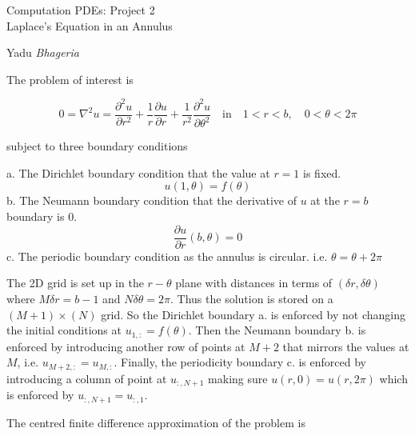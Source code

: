 \documentclass{article}
\begin{document}
\begin{center}
    
    {\Huge Computation PDEs: Project 2}\\
    {\Huge Laplace's Equation in an Annulus}
    \vspace{0.5cm}
    
    {\LARGE Yadu \emph{Bhageria}}\\
    \vspace{0.2cm}
    
\end{center}

The problem of interest is 

\begin{equation}
	0 = \nabla^2 u = \frac{\partial^2 u}{\partial r^2} + \frac{1}{r} \frac{\partial u}{\partial r} + \frac{1}{r^2} \frac{\partial^2 u}{\partial \theta^2}\quad \text{in} \quad 1<r<b, \quad 0<\theta<2\pi
\end{equation}

subject to three boundary conditions

a. The Dirichlet boundary condition that the value at $r = 1$ is fixed.
\begin{equation}
	u(1,\theta) = f(\theta)
\end{equation}
b. The Neumann boundary condition that the derivative of $u$ at the $r = b$ boundary is 0. 
\begin{equation}
	\frac{\partial u}{\partial r} (b, \theta) = 0
\end{equation}
c. The periodic boundary condition as the annulus is circular. i.e. $\theta = \theta + 2\pi$

The 2D grid is set up in the $r-\theta$ plane with distances in terms of $(\delta r, \delta \theta)$ where $M \delta r = b - 1$ and $N\delta \theta = 2\pi$. Thus the solution is stored on a $(M+1) \times (N)$ grid. So the Dirichlet boundary a. is enforced by not changing the initial conditions at $u_{1,:} = f(\theta)$. Then the Neumann boundary b. is enforced by introducing another row of points at $M+2$ that mirrors the values at $M$, i.e. $u_{M+2,:} = u_{M,:}$. Finally, the periodicity boundary c. is enforced by introducing a column of point at $u_{:,N+1}$ making sure $u(r,0) = u(r,2 \pi) $ which is enforced by $u_{:,N+1} = u_{:,1}$.

The centred finite difference approximation of the problem is
\end{document}
